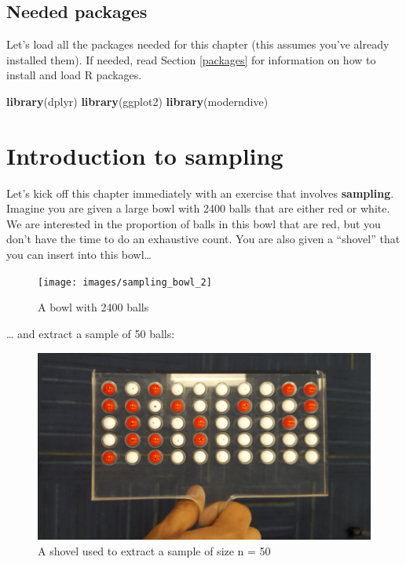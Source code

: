 \documentclass[12pt,]{krantz}
\makeatletter
\newenvironment{Shaded}{\begin{snugshade}}{\end{snugshade}}
\newcommand{\KeywordTok}[1]{\textcolor[rgb]{0.27,0.27,0.27}{\textbf{#1}}}
\newcommand{\NormalTok}[1]{#1}
\newenvironment{kframe}{%
\medskip{}
\setlength{\fboxsep}{.8em}
 \def\at@end@of@kframe{}%
 \ifinner\ifhmode%
  \def\at@end@of@kframe{\end{minipage}}%
  \begin{minipage}{\columnwidth}%
 \fi\fi%
 \def\FrameCommand##1{\hskip\@totalleftmargin \hskip-\fboxsep
 \colorbox{shadecolor}{##1}\hskip-\fboxsep
     \hskip-\linewidth \hskip-\@totalleftmargin \hskip\columnwidth}%
 \MakeFramed {\advance\hsize-\width
   \@totalleftmargin\z@ \linewidth\hsize
   \@setminipage}}%
 {\par\unskip\endMakeFramed%
 \at@end@of@kframe}
\renewenvironment{Shaded}{\begin{kframe}}{\end{kframe}}
\makeatother
\begin{document}
\subsection*{Needed packages}\label{needed-packages-5}


Let's load all the packages needed for this chapter (this assumes you've
already installed them). If needed, read Section \ref{packages} for
information on how to install and load R packages.

\begin{Shaded}
\begin{Highlighting}[]
\KeywordTok{library}\NormalTok{(dplyr)}
\KeywordTok{library}\NormalTok{(ggplot2)}
\KeywordTok{library}\NormalTok{(moderndive)}
\end{Highlighting}
\end{Shaded}

\section{Introduction to sampling}\label{introduction-to-sampling}

Let's kick off this chapter immediately with an exercise that involves
\textbf{sampling}. Imagine you are given a large bowl with 2400 balls
that are either red or white. We are interested in the proportion of
balls in this bowl that are red, but you don't have the time to do an
exhaustive count. You are also given a ``shovel'' that you can insert
into this bowl\ldots{}

\begin{figure}

{\centering \texttt{[image: images/sampling\_bowl\_2]} 

}

\caption{A bowl with 2400 balls}\label{fig:sampling-exercise-1}
\end{figure}

\ldots{} and extract a sample of 50 balls:

\begin{figure}

{\centering \includegraphics[width=0.8\linewidth]{images/sampling_bowl_3_cropped} 

}

\caption{A shovel used to extract a sample of size n = 50}\label{fig:sampling-exercise-2}
\end{figure}
\end{document}
